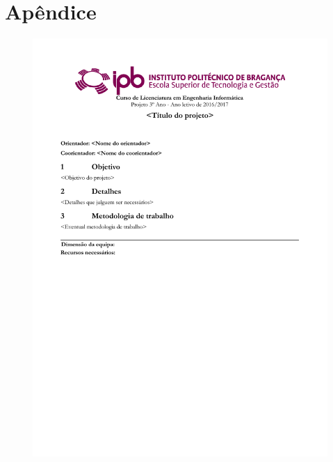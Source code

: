 \chapter{Apêndice}
\label{apendice1}

\begin{figure}
\hspace{-12ex}
\includegraphics{etc/PropostaProjeto.pdf}
\end{figure}

